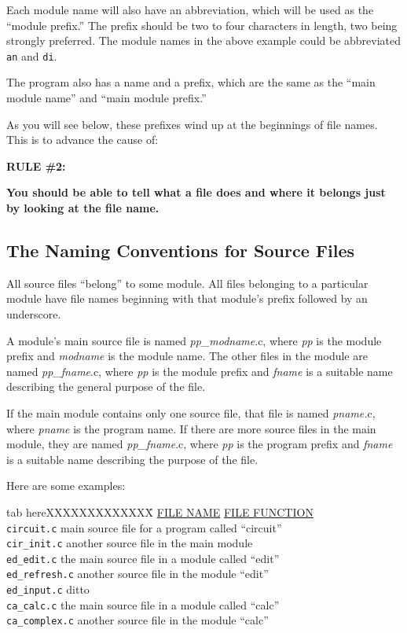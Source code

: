 Each module name will also have an abbreviation, which will be used as
the ``module prefix.''  The prefix should be two to four characters in
length, two being strongly preferred.  The module names in the above
example could be abbreviated {\tt an} and {\tt di}.

The program also has a name and a prefix, which are the same as the
``main module name'' and ``main module prefix.''

As you will see below, these prefixes wind up at the beginnings of
file names.  This is to advance the cause of:\vspace{.25 in}

{\bf RULE \#2:}

{\bf You should be able to tell what a file does and where it belongs
just by looking at the file name.}

\subsection{The Naming Conventions for Source Files}
All source files ``belong'' to some module.  All files belonging to a
particular module have file names beginning with that module's prefix
followed by an underscore.

A module's main source file is named {\em pp\_modname}.c, where {\em
pp} is the module prefix and {\em modname} is the module name.  The
other files in the module are named {\em pp\_fname}.c, where {\em pp}
is the module prefix and {\em fname} is a suitable name describing the
general purpose of the file.

If the main module contains only one source file, that file is named
{\em pname.}c, where {\em pname} is the program name.  If there are
more source files in the main module, they are named {\em
pp\_fname}.c, where {\em pp} is the program prefix and {\em fname} is
a suitable name describing the purpose of the file.

Here are some examples:
\begin{tabbing}
tab hereXXXXXXXXXXXXX\= \kill
\underline{FILE NAME} \> \underline{FILE FUNCTION} \\
{\tt circuit.c} \>main source file for a program called ``circuit''\\
{\tt cir\_init.c} \>another source file in the main module\\
{\tt ed\_edit.c} \>the main source file in a module called ``edit''\\
{\tt ed\_refresh.c} \>another source file in the module ``edit''\\
{\tt ed\_input.c} \>ditto\\
{\tt ca\_calc.c} \>the main source file in a module called ``calc''\\
{\tt ca\_complex.c} \>another source file in the module ``calc''\\
\end{tabbing}

